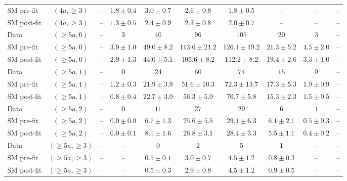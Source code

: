 \begin{table}[h!]
{\begin{tabular}{lccccccccc}
SM pre-fit  & $(4a,\geq 3)$      & --               & $1.8\pm0.4$      & $3.0\pm0.7$    & $2.6\pm0.8$    & $1.8\pm0.5$    & --           & --           & --           \\[0.5ex]
SM post-fit & $(4a,\geq 3)$      & --               & $1.3\pm0.5$      & $2.4\pm0.9$    & $2.3\pm0.8$    & $2.0\pm0.7$    & --           & --           & --           \\[0.5ex]
Data        & $(\geq 5a,0)$      & --               & $3$              & $40$           & $96$           & $105$          & $20$         & $3$          & --           \\[0.5ex]
SM pre-fit  & $(\geq 5a,0)$      & --               & $3.9\pm1.0$      & $49.0\pm8.2$   & $113.6\pm21.2$ & $126.1\pm19.2$ & $21.3\pm5.2$ & $4.5\pm2.0$  & --           \\[0.5ex]
SM post-fit & $(\geq 5a,0)$      & --               & $2.9\pm1.3$      & $44.0\pm5.1$   & $105.6\pm8.2$  & $112.2\pm8.2$  & $19.4\pm2.6$ & $3.3\pm1.0$  & --           \\[0.5ex]
Data        & $(\geq 5a,1)$      & --               & $0$              & $24$           & $60$           & $74$           & $15$         & $0$          & --           \\[0.5ex]
SM pre-fit  & $(\geq 5a,1)$      & --               & $1.2\pm0.3$      & $21.9\pm3.9$   & $51.6\pm10.3$  & $72.3\pm13.7$  & $17.3\pm5.3$ & $1.9\pm0.9$  & --           \\[0.5ex]
SM post-fit & $(\geq 5a,1)$      & --               & $0.8\pm0.4$      & $22.7\pm3.0$   & $56.3\pm5.0$   & $70.7\pm5.8$   & $15.3\pm2.3$ & $1.5\pm0.5$  & --           \\[0.5ex]
Data        & $(\geq 5a,2)$      & --               & $0$              & $11$           & $27$           & $29$           & $6$          & $1$          & --           \\[0.5ex]
SM pre-fit  & $(\geq 5a,2)$      & --               & $0.0\pm0.0$      & $6.7\pm1.3$    & $25.6\pm5.5$   & $29.1\pm6.3$   & $6.1\pm2.1$  & $0.5\pm0.3$  & --           \\[0.5ex]
SM post-fit & $(\geq 5a,2)$      & --               & $0.0\pm0.1$      & $8.1\pm1.6$    & $26.8\pm3.1$   & $28.4\pm3.3$   & $5.5\pm1.1$  & $0.4\pm0.2$  & --           \\[0.5ex]
Data        & $(\geq 5a,\geq 3)$ & --               & --               & $0$            & $2$            & $5$            & $1$          & --           & --           \\[0.5ex]
SM pre-fit  & $(\geq 5a,\geq 3)$ & --               & --               & $0.5\pm0.1$    & $3.0\pm0.7$    & $4.5\pm1.2$    & $0.8\pm0.3$  & --           & --           \\[0.5ex]
SM post-fit & $(\geq 5a,\geq 3)$ & --               & --               & $0.5\pm0.3$    & $2.9\pm0.8$    & $4.5\pm1.2$    & $0.9\pm0.5$  & --           & --           \\[0.5ex]
\hline
\end{tabular}
}
\end{table}

